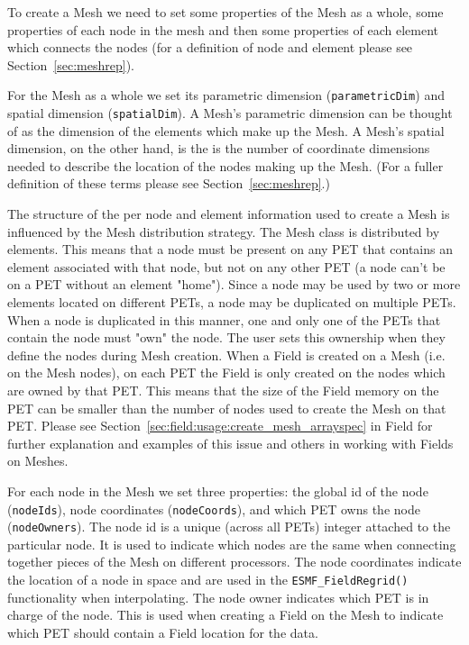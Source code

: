    To create a Mesh we need to set some properties of the Mesh as a whole, some properties of each node in the mesh and 
   then some properties of each element which connects the nodes (for a definition of node and element please see 
   Section~\ref{sec:meshrep}).
  
   For the Mesh as a whole we set its parametric dimension ({\tt parametricDim}) and spatial dimension ({\tt spatialDim}). 
   A Mesh's parametric dimension can be thought of as the dimension of the elements which make up the Mesh.
   A Mesh's spatial dimension, on the other hand, is the is the number of coordinate dimensions needed to describe the location of 
   the nodes making up the Mesh. (For a fuller definition of these terms please see Section~\ref{sec:meshrep}.)
  
   The structure of the per node and element information used to create a Mesh is influenced by the Mesh distribution strategy. 
   The Mesh class is distributed by elements. This means that a node must be present on any PET that contains an element 
   associated with that node, but not on any other PET (a node can't be on a PET without an element "home"). Since a node may be used
   by two or more elements located on different PETs, a node may be duplicated on multiple PETs. When a node is duplicated in this manner, 
   one and only one of the PETs that contain the node must "own" the node. The user sets this ownership when they define the nodes during Mesh creation.
   When a Field is created on a Mesh (i.e. on  the Mesh nodes), on each PET the Field is only created on the nodes which are owned by that PET.
   This means that the size of the Field memory on the PET can be smaller than the number of nodes used to create the Mesh on 
   that PET. Please see Section~\ref{sec:field:usage:create_mesh_arrayspec} in Field for further explanation and examples of this
   issue and others in working with Fields on Meshes. 
  
   \begin{sloppypar}
   For each node in the Mesh we set three properties: the global id of the node ({\tt nodeIds}), node coordinates 
   ({\tt nodeCoords}), and which PET owns the node ({\tt nodeOwners}). The node id is a unique (across all PETs) integer 
   attached to the particular node. It is used to indicate which nodes are the same when connecting together pieces of the 
   Mesh on different processors. The node coordinates indicate the location of a node in space and are used in the
   {\tt ESMF\_FieldRegrid()} functionality when interpolating. The node owner indicates which PET is in charge of the node. This
   is used when creating a Field on the Mesh to indicate which PET should contain a Field location for the data.  
   \end{sloppypar}
   
